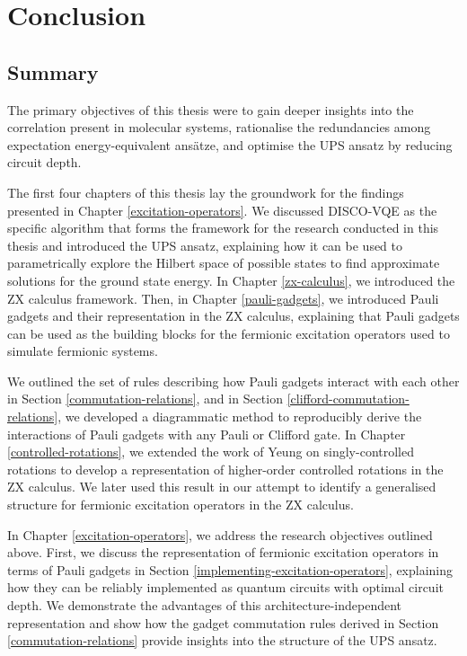 \chapter{Conclusion}%
\label{conclusion}

\section{Summary}

The primary objectives of this thesis were to gain deeper insights into the correlation present in molecular systems, rationalise the redundancies among expectation energy-equivalent ansätze, and optimise the UPS ansatz by reducing circuit depth.

The first four chapters of this thesis lay the groundwork for the findings presented in Chapter \ref{excitation-operators}. We discussed DISCO-VQE as the specific algorithm that forms the framework for the research conducted in this thesis and introduced the UPS ansatz, explaining how it can be used to parametrically explore the Hilbert space of possible states to find approximate solutions for the ground state energy. In Chapter \ref{zx-calculus}, we introduced the ZX calculus framework. Then, in Chapter \ref{pauli-gadgets}, we introduced Pauli gadgets and their representation in the ZX calculus, explaining that Pauli gadgets can be used as the building blocks for the fermionic excitation operators used to simulate fermionic systems.

We outlined the set of rules describing how Pauli gadgets interact with each other in Section \ref{commutation-relations}, and in Section \ref{clifford-commutation-relations}, we developed a diagrammatic method to reproducibly derive the interactions of Pauli gadgets with any Pauli or Clifford gate. In Chapter \ref{controlled-rotations}, we extended the work of Yeung \cite{Yeung2020} on singly-controlled rotations to develop a representation of higher-order controlled rotations in the ZX calculus. We later used this result in our attempt to identify a generalised structure for fermionic excitation operators in the ZX calculus.

In Chapter \ref{excitation-operators}, we address the research objectives outlined above. First, we discuss the representation of fermionic excitation operators in terms of Pauli gadgets in Section \ref{implementing-excitation-operators}, explaining how they can be reliably implemented as quantum circuits with optimal circuit depth. We demonstrate the advantages of this architecture-independent representation and show how the gadget commutation rules derived in Section \ref{commutation-relations} provide insights into the structure of the UPS ansatz.

